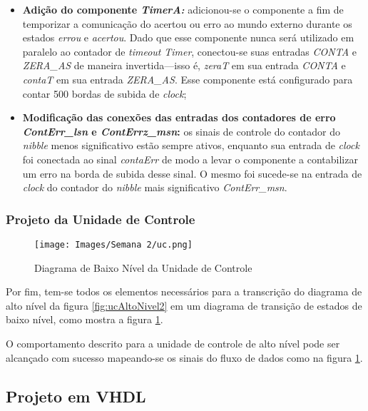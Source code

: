 \documentclass[amsmath,amssymb,floatfix]{report}
\begin{document}
\begin{itemize}
    \item \textbf{Adição do componente \textit{TimerA:}} adicionou-se o componente a fim de temporizar a comunicação do acertou ou erro ao mundo externo durante os estados \textit{errou} e \textit{acertou}. Dado que esse componente nunca será utilizado em paralelo ao contador de \textit{timeout} \textit{Timer}, conectou-se suas entradas \textit{CONTA} e \textit{ZERA\_AS} de maneira invertida---isso é, \textit{zeraT} em sua entrada \textit{CONTA} e \textit{contaT} em sua entrada \textit{ZERA\_AS}. Esse componente está configurado para contar 500 bordas de subida de \textit{clock};
    \item \textbf{Modificação das conexões das entradas dos contadores de erro \textit{ContErr\_lsn} e \textit{ContErrz\_msn}:} os sinais de controle do contador do \textit{nibble} menos significativo estão sempre ativos, enquanto sua entrada de \textit{clock} foi conectada ao sinal \textit{contaErr} de modo a levar o componente a contabilizar um erro na borda de subida desse sinal. O mesmo foi sucede-se na entrada de \textit{clock} do contador do \textit{nibble} mais significativo \textit{ContErr\_msn}. 
\end{itemize}

\subsubsection{Projeto da Unidade de Controle}
\label{subsubsec:uc2}

\begin{figure}[H]
    \centering
    \texttt{[image: Images/Semana 2/uc.png]}
    \caption{Diagrama de Baixo Nível da Unidade de Controle}
    \label{fig:uc2}
\end{figure}

Por fim, tem-se todos os elementos necessários para a transcrição do diagrama de alto nível da figura \ref{fig:ucAltoNivel2} em um diagrama de transição de estados de baixo nível, como mostra a figura \ref{fig:uc2}.

O comportamento descrito para a unidade de controle de alto nível pode ser alcançado com sucesso mapeando-se os sinais do fluxo de dados como na figura \ref{fig:uc2}.

\subsection{Projeto em VHDL}
\label{subsec:projetoVhdl2}
\end{document}
